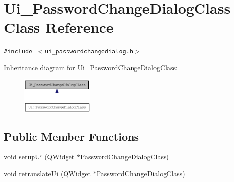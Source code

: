 \hypertarget{class_ui___password_change_dialog_class}{
\section{Ui\_\-PasswordChangeDialogClass Class Reference}
\label{class_ui___password_change_dialog_class}
}
{\tt \#include $<$ui\_\-passwordchangedialog.h$>$}

Inheritance diagram for Ui\_\-PasswordChangeDialogClass:\nopagebreak
\begin{figure}[H]
\begin{center}
\leavevmode
\includegraphics[width=101pt]{class_ui___password_change_dialog_class__inherit__graph}
\end{center}
\end{figure}
\subsection*{Public Member Functions}
\begin{CompactItemize}
\item 
void \hyperlink{class_ui___password_change_dialog_class_6f704152a5246469761f4ab6500b53a5}{setupUi} (QWidget $\ast$PasswordChangeDialogClass)
\item 
void \hyperlink{class_ui___password_change_dialog_class_65ba8872fab87cd6e9d798b2ff957f60}{retranslateUi} (QWidget $\ast$PasswordChangeDialogClass)
\end{CompactItemize}
